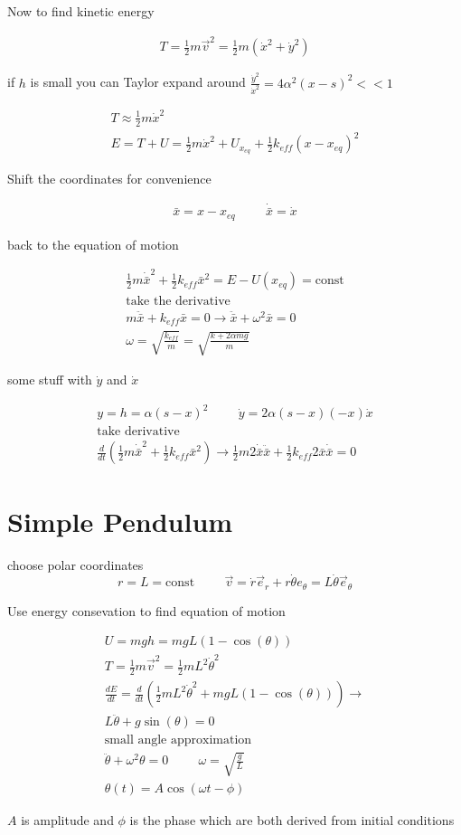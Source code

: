 \documentclass[fleqn]{report}
\newcommand{\hp}{\hspace{1cm}}
\newcommand{\const}{\textrm{const}}
\newcommand{\equations} [1] {
\begin{gather*}
#1
\end{gather*}
}
\begin{document}
Now to find kinetic energy 

\equations{
    T = \frac{1}{2} m \vec v^2 = 
    \frac{1}{2} m (\dot x^2 + \dot y^2)
}

if $h$ is small you can Taylor expand around $\frac{\dot y^2}{\dot x^2} = 4 \alpha^2 (x - s)^2 << 1$

\equations{
    T \approx \frac{1}{2} m \dot x^2
    \\
    E = T + U = 
    \frac{1}{2} m \dot x^2 + U_{x_{eq}} + \frac{1}{2}k_{eff}(x - x_{eq})^2
}

Shift the coordinates for convenience

\equations{
    \bar x = x - x_{eq} 
    \hp 
    \dot \bar x = \dot x 
}

back to the equation of motion

\equations{
    \frac{1}{2} m \dot \bar x^2 + \frac{1}{2} k_{eff} \bar x^2 
    =
    E - U(x_{eq}) = \const
    \\
    \textrm{take the derivative}
    \\
    m \ddot {\bar x} + k_{eff} \bar x = 0
    \rightarrow 
    \ddot \bar x + \omega^2 \bar x = 0
    \\
    \omega = \sqrt{\frac{k_{eff}}{m}}
    =
    \sqrt{\frac{k + 2 \alpha m g}{m}}
}

some stuff with $\dot y$ and $\dot x$

\equations{
    y = h = \alpha (s -x)^2
    \hp 
    \dot y = 2 \alpha (s - x)(-x) \dot x
    \\
    \textrm{take derivative}
    \\
    \frac{d}{dt} (\frac{1}{2} m \dot {\bar x}^2 + \frac{1}{2} k_{eff} \bar x^2)
    \rightarrow 
    \frac{1}{2} m 2 \dot {\bar x} \ddot {\bar x} + \frac{1}{2} k_{eff} 2 \bar x \dot {\bar x} = 0
}

\section{Simple Pendulum}


choose polar coordinates 
\[
r = L = \const \hp \vec v = \dot r \vec e_r + r \dot \theta e_\theta = L \dot \theta \vec e_\theta
\]

Use energy consevation to find equation of motion 
\equations{
    U = mgh = mgL(1 - \cos(\theta))
    \\
    T = \frac{1}{2} m \vec v^2 = \frac{1}{2} m L^2 \dot \theta^2
    \\
    \frac{dE}{dt} = \frac{d}{dt} (\frac{1}{2} m L^2 \dot \theta^2 +  mgL(1 - \cos(\theta)) )
    \rightarrow 
    \\
    L \ddot \theta + g \sin(\theta) = 0 
    \\
    \textrm{small angle approximation}
    \\
    \ddot \theta + \omega^2 \theta = 0
    \hp 
    \omega = \sqrt{\frac{g}{L}}
    \\
    \theta(t) = A \cos(\omega t - \phi)
}
$A$ is amplitude and $\phi$ is the phase which are both derived from initial conditions 
\end{document}
